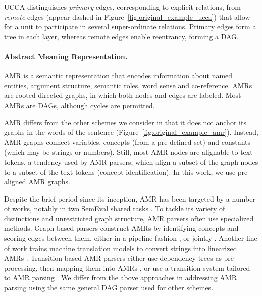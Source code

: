 \documentclass[11pt,a4paper]{article}
\begin{document}
UCCA distinguishes \textit{primary} edges, corresponding 
to explicit relations, from \textit{remote} edges (appear dashed in
Figure~\ref{fig:original_example_ucca}) that allow for a unit to participate
in several super-ordinate relations.
Primary edges form a tree in each layer, whereas remote edges enable reentrancy, forming a DAG.

\paragraph{Abstract Meaning Representation.}\label{sec:amr}

AMR \cite{banarescu2013abstract} is a semantic representation that encodes information about named entities, 
argument structure, semantic roles, word sense and co-reference.
AMRs are rooted directed graphs, in which both nodes and edges are labeled.
Most AMRs are DAGs, although cycles are permitted.

AMR differs from the other schemes we consider in that it does not anchor its graphs
in the words of the sentence (Figure~\ref{fig:original_example_amr}). Instead, AMR graphs
connect variables, concepts (from a pre-defined set) and constants (which may be strings or numbers).
Still, most AMR nodes are alignable to text tokens, a tendency used by AMR parsers,
which align a subset of the graph nodes to a subset of the text tokens (concept identification). In this work, we use pre-aligned AMR graphs.

Despite the brief period since its inception, AMR has been targeted by a number of works,
notably in two SemEval shared tasks \cite{may2016semeval,may2017semeval}.
To tackle its variety of distinctions and unrestricted graph structure,
AMR parsers often use specialized methods.
Graph-based parsers construct AMRs
by identifying concepts and scoring edges between them, either in a pipeline fashion
\cite{flanigan2014discriminative,artzi2015broad,pust2015parsing,foland2017abstract},
or jointly \cite{zhou2016amr}.
Another line of work %
trains machine translation models to convert strings into linearized AMRs
\cite{barzdins2016riga,Gildea2017AddressingTD,Konstas2017NeuralAS,Buys2017RobustIN}.
Transition-based AMR parsers either 
use dependency trees as pre-processing, then mapping them into AMRs
\cite{wang-xue-pradhan:2015:ACL-IJCNLP,wang2015transition,wang-EtAl:2016:SemEval,goodman2016noise},
or use a transition system tailored to AMR parsing \cite{damonte-17,D17-1130}.
We differ from the above approaches in addressing AMR parsing 
using the same general DAG parser used for other schemes.
\end{document}
